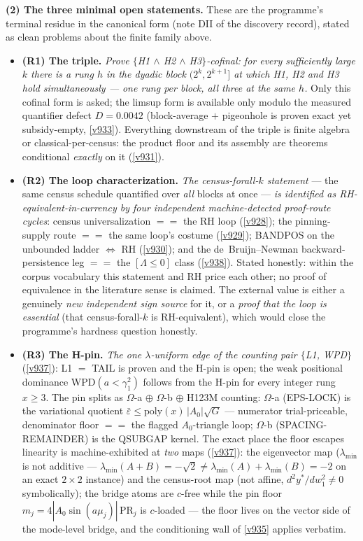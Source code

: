\documentclass[11pt,a4paper]{article}
\begin{document}
\par\smallskip\noindent\textbf{(2) The three minimal open statements.}  These are the
programme's terminal residue in the canonical form (note DII of the discovery record), stated
as clean problems about the finite family above.
\begin{itemize}
\item \textbf{(R1) The triple.}  \emph{Prove $\{$H1 $\wedge$ H2 $\wedge$ H3$\}$-cofinal: for
  every sufficiently large $k$ there is a rung $h$ in the dyadic block $(2^k, 2^{k+1}]$ at
  which H1, H2 and H3 hold simultaneously --- one rung per block, all three at the same $h$.}
  Only this cofinal form is asked; the limsup form is available only modulo the measured
  quantifier defect $D = 0.0042$ (block-average $+$ pigeonhole is proven exact yet
  subsidy-empty, \vref{v933}).  Everything downstream of the triple is finite algebra or
  classical-per-census: the product floor and its assembly are theorems conditional
  \emph{exactly} on it (\vref{v931}).
\item \textbf{(R2) The loop characterization.}  \emph{The census-forall-$k$ statement} ---
  the same census schedule quantified over \emph{all} blocks at once --- \emph{is identified
  as RH-equivalent-in-currency by four independent machine-detected proof-route cycles}:
  census universalization $==$ the RH loop (\vref{v928}); the pinning-supply route $==$ the
  same loop's costume (\vref{v929}); BANDPOS on the unbounded ladder $\iff$ RH (\vref{v930});
  and the de~Bruijn--Newman backward-persistence leg $==$ the $[\Lambda \le 0]$ class
  (\vref{v938}).  Stated honestly: within the corpus vocabulary this statement and RH price
  each other; no proof of equivalence in the literature sense is claimed.  The external value
  is either a genuinely \emph{new independent sign source} for it, or a \emph{proof that the
  loop is essential} (that census-forall-$k$ is RH-equivalent), which would close the
  programme's hardness question honestly.
\item \textbf{(R3) The H-pin.}  \emph{The one $\lambda$-uniform edge of the counting pair
  $\{$L1, WPD$\}$} (\vref{v937}): L1 $=$ TAIL is proven and the H-pin is open; the weak
  positional dominance WPD$(a < \gamma_1^2)$ follows from the H-pin for every integer rung
  $x \ge 3$.  The pin splits as $\Omega$-a $\oplus$ $\Omega$-b $\oplus$ H123M counting:
  $\Omega$-a (EPS-LOCK) is the variational quotient $\bar\varepsilon \le
  \mathrm{poly}(x)\,|A_0|\sqrt G$ --- numerator trial-priceable, denominator floor $==$ the
  flagged $A_0$-triangle loop; $\Omega$-b (SPACING-REMAINDER) is the QSUBGAP kernel.  The
  exact place the floor escapes linearity is machine-exhibited at \emph{two} maps
  (\vref{v937}): the eigenvector map ($\lambda_{\min}$ is not additive ---
  $\lambda_{\min}(A{+}B) = -\sqrt2 \ne \lambda_{\min}(A) + \lambda_{\min}(B) = -2$ on an exact
  $2\times2$ instance) and the census-root map (not affine, $d^2y^*/dw_1^2 \ne 0$
  symbolically); the bridge atoms are $c$-free while the pin floor $m_j =
  4|A_0\sin(a\mu_j)|\,\mathrm{PR}_j$ is $c$-loaded --- the floor lives on the vector side of
  the mode-level bridge, and the conditioning wall of \vref{v935} applies verbatim.
\end{itemize}
\end{document}
